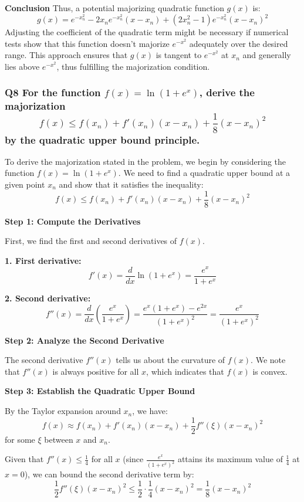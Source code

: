 \documentclass[8pt]{article}
\begin{document}
{\textbf{Conclusion}
Thus, a potential majorizing quadratic function \( g(x) \) is:
\[
g(x) = e^{-x_n^2} - 2x_n e^{-x_n^2} (x - x_n) + (2x_n^2 - 1) e^{-x_n^2} (x - x_n)^2
\]
Adjusting the coefficient of the quadratic term might be necessary if numerical tests show that this function doesn't majorize \( e^{-x^2} \) adequately over the desired range. This approach ensures that \( g(x) \) is tangent to \( e^{-x^2} \) at \( x_n \) and generally lies above \( e^{-x^2} \), thus fulfilling the majorization condition.

\subsubsection*{Q8 For the function \( f(x) = \ln(1 + e^x) \), derive the majorization
\[
f(x) \leq f(x_n) + f'(x_n)(x - x_n) + \frac{1}{8} (x - x_n)^2
\]
by the quadratic upper bound principle.}

To derive the majorization stated in the problem, we begin by considering the function \( f(x) = \ln(1 + e^x) \). We need to find a quadratic upper bound at a given point \( x_n \) and show that it satisfies the inequality:
\[
f(x) \leq f(x_n) + f'(x_n)(x - x_n) + \frac{1}{8} (x - x_n)^2
\]

\textbf{Step 1: Compute the Derivatives}

First, we find the first and second derivatives of \( f(x) \).

\textbf{1. First derivative:}
   \[
   f'(x) = \frac{d}{dx} \ln(1 + e^x) = \frac{e^x}{1 + e^x}
   \]

\textbf{2. Second derivative:}
   \[
   f''(x) = \frac{d}{dx} \left( \frac{e^x}{1 + e^x} \right) = \frac{e^x(1 + e^x) - e^{2x}}{(1 + e^x)^2} = \frac{e^x}{(1 + e^x)^2}
   \]

\textbf{Step 2: Analyze the Second Derivative}

The second derivative \( f''(x) \) tells us about the curvature of \( f(x) \). We note that \( f''(x) \) is always positive for all \( x \), which indicates that \( f(x) \) is convex.

\textbf{Step 3: Establish the Quadratic Upper Bound}

By the Taylor expansion around \( x_n \), we have:
\[
f(x) \approx f(x_n) + f'(x_n)(x - x_n) + \frac{1}{2}f''(\xi)(x - x_n)^2
\]
for some \( \xi \) between \( x \) and \( x_n \).

Given that \( f''(x) \leq \frac{1}{4} \) for all \( x \) (since \( \frac{e^x}{(1 + e^x)^2} \) attains its maximum value of \( \frac{1}{4} \) at \( x = 0 \)), we can bound the second derivative term by:
\[
\frac{1}{2}f''(\xi)(x - x_n)^2 \leq \frac{1}{2} \cdot \frac{1}{4} (x - x_n)^2 = \frac{1}{8} (x - x_n)^2
\]

}
\end{document}

